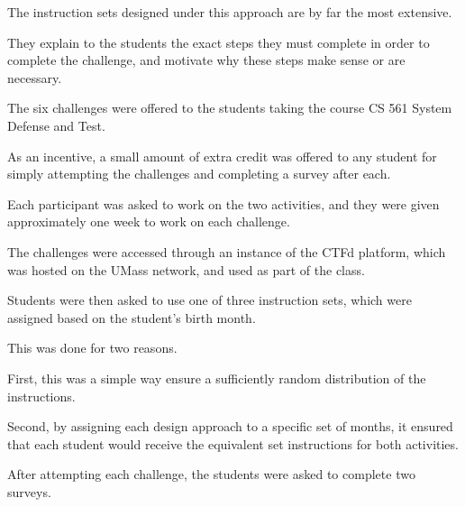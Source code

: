         The instruction sets designed under this approach are by far the most extensive. %



They explain to the students the exact steps they must complete in order to complete the challenge, and motivate why these steps make sense or are necessary. 










    The six challenges were offered to the students taking the course CS 561 System Defense and Test. %



As an incentive, a small amount of extra credit was offered to any student for simply attempting the challenges and completing a survey after each. %



Each participant was asked to work on the two activities, and they were given approximately one week to work on each challenge. %



The challenges were accessed through an instance of the CTFd platform, which was hosted on the UMass network, and used as part of the class. %



Students were then asked to use one of three instruction sets, which were assigned based on the student's birth month. %



This was done for two reasons. %



First, this was a simple way ensure a sufficiently random distribution of the instructions. %



Second, by assigning each design approach to a specific set of months, it ensured that each student would receive the equivalent set instructions for both activities. 










    After attempting each challenge, the students were asked to complete two surveys. %




